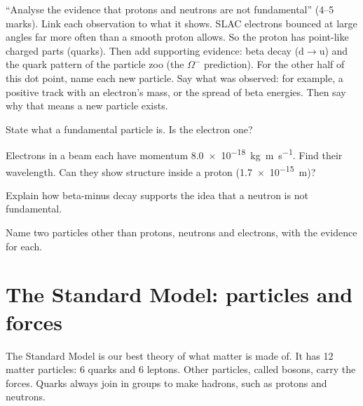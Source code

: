 \begin{examtip}
``Analyse the evidence that protons and neutrons are not fundamental'' (4--5 marks).
Link each observation to what it shows. SLAC electrons bounced at large angles far more
often than a smooth proton allows. So the proton has point-like charged parts (quarks).
Then add supporting evidence: beta decay ($\mathrm{d} \to \mathrm{u}$) and the quark
pattern of the particle zoo (the $\Omega^-$ prediction). For the other half of this dot
point, name each new particle. Say what was observed: for example, a positive track with an
electron's mass, or the spread of beta energies. Then say why that means a new particle
exists.
\end{examtip}

\begin{quickcheck}
  \item State what a fundamental particle is. Is the electron one?
  \item Electrons in a beam each have momentum \qty{8.0e-18}{kg.m.s^{-1}}. Find their
        wavelength. Can they show structure inside a proton (\qty{1.7e-15}{m})?
  \item Explain how beta-minus decay supports the idea that a neutron is not fundamental.
  \item Name two particles other than protons, neutrons and electrons, with the evidence
        for each.
\end{quickcheck}

\section{The Standard Model: particles and forces}\label{ch5:sec:sm}

\begin{bigidea}
The Standard Model is our best theory of what matter is made of. It has 12 matter
particles: 6 quarks and 6 leptons. Other particles, called bosons, carry the forces.
Quarks always join in groups to make hadrons, such as protons and neutrons.
\end{bigidea}

\begin{keywords}
\end{keywords}

